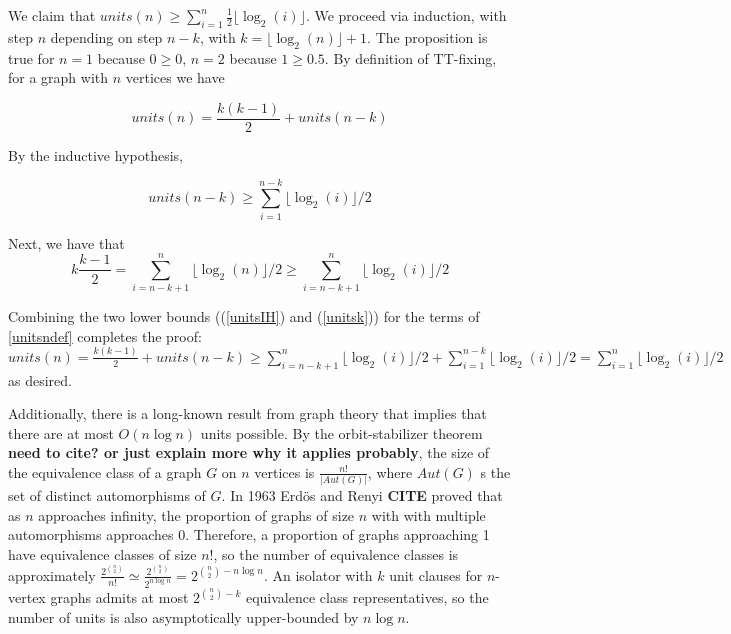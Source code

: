 \documentclass[a4paper,UKenglish,cleveref, autoref, thm-restate]{lipics-v2021}
\begin{document}
We claim that $units(n) \geq \sum\limits_{i=1}^n \frac{1}{2} \lfloor \log_2(i) \rfloor$. We proceed via induction, with step $n$ depending on step $n-k$, with $k=\lfloor \log_2(n)\rfloor + 1$. The proposition is true for $n=1$ because $0 \geq 0$, $n=2$ because $ 1 \geq 0.5$.  By definition of TT-fixing, for a graph with $n$ vertices we have 

\begin{equation}\label{unitsndef}
units(n) = \frac{k(k-1)}{2}  + units(n-k)
\end{equation} 

By the inductive hypothesis,

 \begin{equation}\label{unitsIH}
 units(n-k) \geq \sum\limits_{i=1}^{n-k} \lfloor \log_2(i)\rfloor/2
 \end{equation}
 
 Next, we have that 
 \begin{equation}\label{unitsk}
 k\frac{k-1}{2} =  \sum\limits_{i=n-k+1}^{n} \lfloor \log_2(n)\rfloor/2 \geq \sum\limits_{i=n-k+1}^{n} \lfloor \log_2(i)\rfloor/2
 \end{equation}
 
 Combining the two lower bounds ((\ref{unitsIH}) and (\ref{unitsk})) for the terms of \cref{unitsndef} completes the proof: $units(n) = \frac{k(k-1)}{2} + units(n-k) \geq \sum\limits_{i=n-k+1}^{n} \lfloor \log_2(i)\rfloor/2 + \sum\limits_{i=1}^{n-k} \lfloor \log_2(i)\rfloor/2 = \sum\limits_{i=1}^{n} \lfloor \log_2(i)\rfloor/2$ as desired.

Additionally, there is a long-known result from graph theory that implies that there are at most $O(n\log n)$ units possible. By the orbit-stabilizer theorem \textbf{need to cite? or just explain more why it applies probably}, the size of the equivalence class of a graph $G$ on $n$ vertices is $\frac{n!}{|Aut(G)|}$, where $Aut(G)$ s the set of distinct automorphisms of $G$. In 1963 Erd\"os and Renyi \textbf{CITE} proved that as $n$ approaches infinity, the proportion of graphs of size $n$ with with multiple automorphisms approaches 0. Therefore, a proportion of graphs approaching 1 have equivalence classes of size $n!$, so the number of equivalence classes is approximately $\frac{2^{n \choose 2}}{n!} \simeq \frac{2^{n \choose 2}}{2^{n\log n}} = 2^{{n \choose 2} - n\log n}$. An isolator with $k$ unit clauses for $n$-vertex graphs admits at most $2^{{n \choose 2} - k}$ equivalence class representatives, so the number of units is also asymptotically upper-bounded by $n \log n$.
\end{document}
